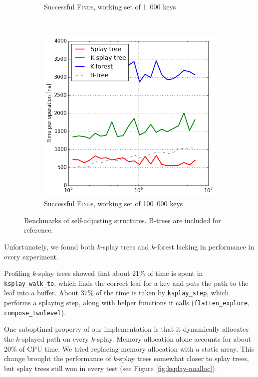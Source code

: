 \begin{figure}
\begin{subfigure}[t]{0.31\textwidth}
	\caption{Successful \textsc{Find}s, working set of 1~000 keys}
	\label{fig:sub:self-adj-ws-1k}
\end{subfigure}
~
\begin{subfigure}[t]{0.31\textwidth}
	\includegraphics[width=\textwidth]{img/performance/self-adj-ws-100k}
	\caption{Successful \textsc{Find}s, working set of 100~000 keys}
	\label{fig:sub:self-adj-ws-100k}
\end{subfigure}
\caption{Benchmarks of self-adjusting structures.
	B-trees are included for reference.}
\label{fig:self-adj-performance}
\end{figure}

Unfortunately, we found both $k$-splay trees and $k$-forest lacking in
performance in every experiment.

Profiling $k$-splay trees showed that about 21\% of time is spent in
\texttt{ksplay\_walk\_to}, which finds the correct leaf for a key and puts the
path to the leaf into a buffer. About 37\% of the time is taken by
\texttt{ksplay\_step}, which performs a splaying step, along with helper
functions it calls (\texttt{flatten\_explore}, \texttt{compose\_twolevel}).

One suboptimal property of our implementation is that it dynamically
allocates the $k$-splayed path on every $k$-splay. Memory allocation alone
accounts for about 20\% of CPU time.
We tried replacing memory allocation with a static array. This change
brought the performance of $k$-splay trees somewhat closer to splay trees,
but splay trees still won in every test (see Figure \ref{fig:ksplay-noalloc}).

